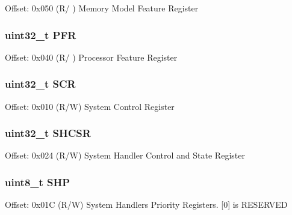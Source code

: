 Offset\-: 0x050 (R/ ) Memory Model Feature Register \hypertarget{struct_s_c_b___type_a0c3c74d90886d6f470882c63c0e60bfe}{
\subsubsection[{P\-F\-R}]{ uint32\-\_\-t P\-F\-R}}\label{struct_s_c_b___type_a0c3c74d90886d6f470882c63c0e60bfe}
Offset\-: 0x040 (R/ ) Processor Feature Register \hypertarget{struct_s_c_b___type_a64a95891ad3e904dd5548112539c1c98}{
\subsubsection[{S\-C\-R}]{ uint32\-\_\-t S\-C\-R}}\label{struct_s_c_b___type_a64a95891ad3e904dd5548112539c1c98}
Offset\-: 0x010 (R/\-W) System Control Register \hypertarget{struct_s_c_b___type_a04d136e5436e5fa2fb2aaa78a5f86b19}{
\subsubsection[{S\-H\-C\-S\-R}]{ uint32\-\_\-t S\-H\-C\-S\-R}}\label{struct_s_c_b___type_a04d136e5436e5fa2fb2aaa78a5f86b19}
Offset\-: 0x024 (R/\-W) System Handler Control and State Register \hypertarget{struct_s_c_b___type_af6c413ed8c7d1b792a91f01e13b47adf}{
\subsubsection[{S\-H\-P}]{ uint8\-\_\-t S\-H\-P}}\label{struct_s_c_b___type_af6c413ed8c7d1b792a91f01e13b47adf}
Offset\-: 0x01\-C (R/\-W) System Handlers Priority Registers. \mbox{[}0\mbox{]} is R\-E\-S\-E\-R\-V\-E\-D

